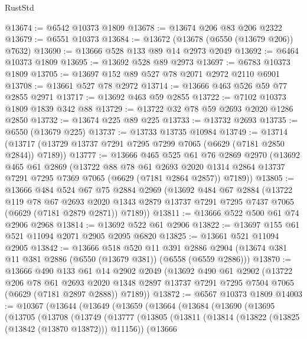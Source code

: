 \begin{lexlean}{RustStd}
\begin{coremodule}
@13674 := @6542 @10373 @1809
@13678 := @13674 @206 @83 @206 @2322
@13679 := @6551 @10373
@13684 := @13672 (@13678 (@6550 (@13679 @206)) @7632)
@13690 := @13666 @528 @133 @89 @14 @2973 @2049
@13692 := @6464 @10373 @1809
@13695 := @13692 @528 @89 @2973
@13697 := @6783 @10373 @1809
@13705 := @13697 @152 @89 @527 @78 @2071 @2972 @2110 @6901
@13708 := @13661 @527 @78 @2972
@13714 := @13666 @463 @526 @59 @77 @2855 @2971
@13717 := @13692 @463 @59 @2855
@13722 := @7102 @10373 @1809 @1839 @342 @88
@13729 := @13722 @32 @78 @59 @2693 @2020 @1286 @2850
@13732 := @13674 @225 @89 @225
@13733 := @13732 @2693
@13735 := @6550 (@13679 @225)
@13737 := @13733 @13735 @10984
@13749 := @13714 (@13717 (@13729 @13737 @7291 @7295 @7299 @7065 (@6629 (@7181 @2850 @2844)) @7189))
@13777 := @13666
    @465
    @525
    @61
    @76
    @2869
    @2970
    (@13692
      @465
      @61
      @2869
      (@13722
        @88
        @78
        @61
        @2693
        @2020
        @1314
        @2864
        @13737
        @7291
        @7295
        @7369
        @7065
        (@6629 (@7181 @2864 @2857))
        @7189))
@13805 := @13666
    @484
    @524
    @67
    @75
    @2884
    @2969
    (@13692
      @484
      @67
      @2884
      (@13722
        @119
        @78
        @67
        @2693
        @2020
        @1343
        @2879
        @13737
        @7291
        @7295
        @7437
        @7065
        (@6629 (@7181 @2879 @2871))
        @7189))
@13811 := @13666 @522 @500 @61 @74 @2906 @2968
@13814 := @13692 @522 @61 @2906
@13822 := @13697 @155 @61 @521 @11094 @2071 @2905 @2095 @6820
@13825 := @13661 @521 @11094 @2905
@13842 := @13666
    @518
    @520
    @11
    @391
    @2886
    @2904
    (@13674 @381 @11 @381 @2886 (@6550 (@13679 @381)) (@6558 (@6559 @2886)))
@13870 := @13666
    @490
    @133
    @61
    @14
    @2902
    @2049
    (@13692
      @490
      @61
      @2902
      (@13722
        @206
        @78
        @61
        @2693
        @2020
        @1348
        @2897
        @13737
        @7291
        @7295
        @7504
        @7065
        (@6629 (@7181 @2897 @2888))
        @7189))
@13872 := @6567 @10373 @1809
@14003 := @10367
    (@13644
      (@13649
        (@13659
          (@13664
            (@13684
              (@13690
                (@13695
                  (@13705
                    (@13708
                      (@13749
                        (@13777
                          (@13805
                            (@13811
                              (@13814 (@13822 (@13825 (@13842 (@13870 @13872))) @11156))
                              (@13666

\end{coremodule}
\end{lexlean}
